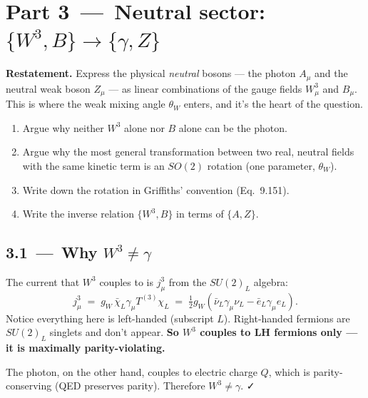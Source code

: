 \documentclass[11pt]{article}
\begin{document}
\newpage

\section*{Part 3 \,---\, Neutral sector: $\{W^3, B\} \to \{\gamma, Z\}$}

\begin{problembox}
\textbf{Restatement.} Express the physical \emph{neutral} bosons --- the photon $A_\mu$
and the neutral weak boson $Z_\mu$ --- as linear combinations of the gauge fields $W^3_\mu$
and $B_\mu$. This is where the weak mixing angle $\theta_W$ enters, and it's the heart of
the question.
\end{problembox}

\begin{deliverbox}
\begin{enumerate}[leftmargin=*]
  \item Argue why neither $W^3$ alone nor $B$ alone can be the photon.
  \item Argue why the most general transformation between two real, neutral fields with the
        same kinetic term is an $SO(2)$ rotation (one parameter, $\theta_W$).
  \item Write down the rotation in Griffiths' convention (Eq.~9.151).
  \item Write the inverse relation $\{W^3, B\}$ in terms of $\{A, Z\}$.
\end{enumerate}
\end{deliverbox}

\subsection*{3.1 \,---\, Why $W^3 \neq \gamma$}

\begin{stepbox}[title=Step 3.1: $W^3$ couples only to left-handed fermions]
The current that $W^3$ couples to is $j^3_\mu$ from the $SU(2)_L$ algebra:
\[
j^3_\mu \;=\; g_W\, \bar\chi_L \gamma_\mu T^{(3)} \chi_L
\;=\; \tfrac{1}{2} g_W\!\left( \bar\nu_L \gamma_\mu \nu_L - \bar e_L \gamma_\mu e_L \right) .
\]
Notice everything here is left-handed (subscript $L$). Right-handed fermions are $SU(2)_L$
singlets and don't appear. \textbf{So $W^3$ couples to LH fermions only --- it is maximally
parity-violating.}

The photon, on the other hand, couples to electric charge $Q$, which is parity-conserving
(QED preserves parity). Therefore $W^3 \neq \gamma$. ✓
\end{stepbox}
\end{document}
